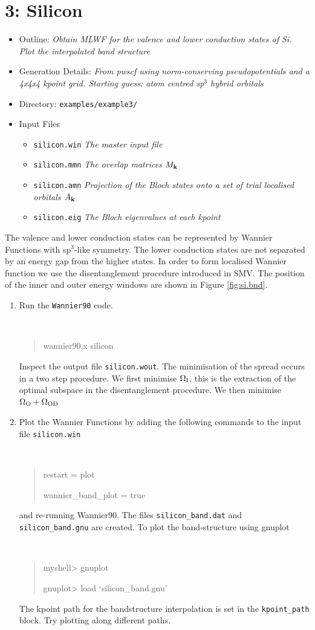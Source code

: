 \documentclass[a4paper,11pt,twoside]{article}
\begin{document}
\cleardoublepage


\section*{3: Silicon}

\begin{itemize}
\item{Outline: \it{Obtain MLWF for the valence and lower conduction states of Si. Plot the interpolated band structure}}
\item{Generation Details: \it{From pwscf using norm-conserving pseudopotentials
and a 4x4x4 kpoint grid. Starting guess:  atom centred sp$^3$ hybrid orbitals}}
\item{Directory: {\tt examples/example3/}}
\item{Input Files}
\begin{itemize}
\item{ {\tt silicon.win}  {\it The master input file}}
\item{ {\tt silicon.mmn}  {\it The overlap matrices $M_{{\bf k}}$}}
\item{ {\tt silicon.amn}  {\it Projection of the Bloch states onto a set of trial localised orbitals $A_{{\bf k}}$}}
\item{ {\tt silicon.eig}  {\it The Bloch eigenvalues at each kpoint}}
\end{itemize}
\end{itemize}
The valence and lower conduction states can be represented by Wannier Functions with sp$^3$-like symmetry. The lower conduction states are not separated by an energy gap from the higher states. In order to form localised Wannier function we use the disentanglement procedure introduced in SMV. The position of the inner and outer energy windows are shown in Figure \ref{fig:si.bnd}.
\begin{enumerate}
\item Run the {\tt Wannier90} code.
{\tt
\begin{quote}
wannier90.x silicon
\end{quote} }
Inspect the output file {\tt silicon.wout}. The minimisation of the spread occurs in a two step procedure. We first minimise $\Omega_{\rm I}$, this is the extraction of the optimal subspace in the disentanglement procedure. We then minimise $\Omega_{\rm O}+\Omega_{{\rm OD}}$


\item Plot the Wannier Functions by adding the following commands to the input file {\tt silicon.win}
{\tt
\begin{quote}
restart = plot

wannier\_band\_plot = true
\end{quote} }
and re-running Wannier90. The files {\tt silicon\_band.dat} and {\tt silicon\_band.gnu} are created.
To plot the band-structure using gnuplot
\smallskip
{\tt
\begin{quote}
myshell> gnuplot

gnuplot> load `silicon\_band.gnu'
\end{quote} }
The kpoint path for the bandstructure interpolation is set in the {\tt kpoint\_path} block. Try plotting along different paths.
\end{enumerate}
\end{document}
